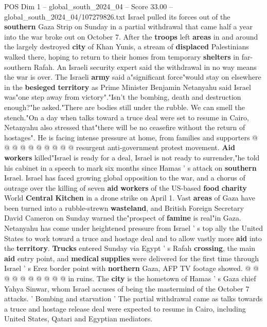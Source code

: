 \begin{textsample}{POS Dim 1 – global\_south\_2024\_04 – Score 33.00 – global\_south\_2024\_04/107279826.txt}  \label{ex:f1_pos_142}
Israel pulled its forces out of the \textbf{southern} Gaza Strip on Sunday in a partial withdrawal that came half a year into the war broke out on October 7.
After the \textbf{troops} left \textbf{areas} in and around the largely destroyed \textbf{city} of Khan Yunis, a stream of \textbf{displaced} Palestinians walked there, hoping to return to their homes from temporary \textbf{shelters} in far-southern Rafah.
An Israeli security expert said the withdrawal in no way means the war is over.
The Israeli \textbf{army} said a"significant force"would stay on elsewhere in the \textbf{besieged} \textbf{territory} as Prime Minister Benjamin Netanyahu said Israel was"one step away from victory"."Isn't the bombing, death and destruction enough?"he asked."There are bodies still under the rubble.
We can smell the stench."On a day when talks toward a truce deal were set to resume in Cairo, Netanyahu also stressed that"there will be no ceasefire without the return of hostages".
He is facing intense pressure at home, from families and supporters @ @ @ @ @ @ @ @ @ @ resurgent anti-government protest movement. \textbf{Aid} \textbf{workers} killed"Israel is ready for a deal, Israel is not ready to surrender,"he told his cabinet in a speech to mark six months since Hamas ' s attack on \textbf{southern} Israel.
Israel has faced growing global opposition to the war, and a chorus of outrage over the killing of seven \textbf{aid} \textbf{workers} of the US-based \textbf{food} \textbf{charity} World \textbf{Central} \textbf{Kitchen} in a drone strike on April 1.
Vast \textbf{areas} of Gaza have been turned into a rubble-strewn \textbf{wasteland}, and British Foreign Secretary David Cameron on Sunday warned the"prospect of \textbf{famine} is real"in Gaza.
Netanyahu has come under heightened pressure from Israel ' s top ally the United States to work toward a truce and hostage deal and to allow vastly more \textbf{aid} into the \textbf{territory}. \textbf{Trucks} entered Sunday via Egypt ' s Rafah \textbf{crossing}, the main \textbf{aid} entry point, and \textbf{medical} \textbf{supplies} were delivered for the first time through Israel ' s Erez border point with \textbf{northern} Gaza, AFP TV footage showed. @ @ @ @ @ @ @ @ @ @ in ruins.
The \textbf{city} is the hometown of Hamas ' s Gaza chief Yahya Sinwar, whom Israel accuses of being the mastermind of the October 7 attacks. ' Bombing and starvation ' The partial withdrawal came as talks towards a truce and hostage release deal were expected to resume in Cairo, including United States, Qatari and Egyptian mediators.

\end{textsample}
